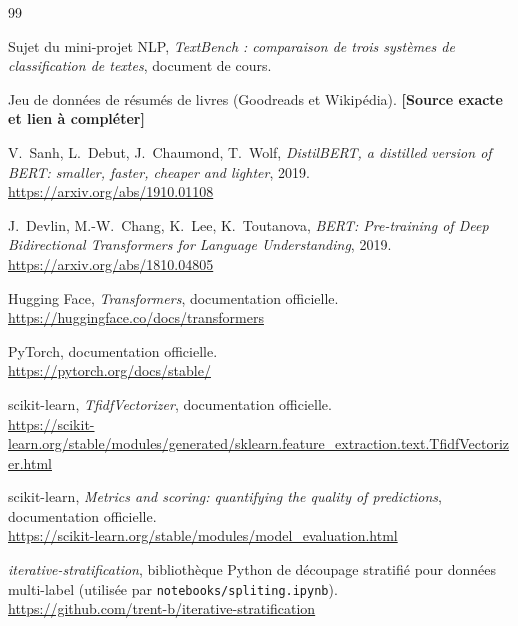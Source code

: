 \documentclass[11pt,a4paper]{article}
\newcommand{\afournir}[1]{\textbf{[#1 à compléter]}}
\begin{document}
\newpage
{}
\begin{thebibliography}{99}

Sujet du mini-projet NLP, \textit{TextBench : comparaison de trois systèmes de classification de textes}, document de cours.

Jeu de données de résumés de livres (Goodreads et Wikipédia). \afournir{Source exacte et lien}

V.~Sanh, L.~Debut, J.~Chaumond, T.~Wolf, \textit{DistilBERT, a distilled version of BERT: smaller, faster, cheaper and lighter}, 2019. \\
\url{https://arxiv.org/abs/1910.01108}

J.~Devlin, M.-W.~Chang, K.~Lee, K.~Toutanova, \textit{BERT: Pre-training of Deep Bidirectional Transformers for Language Understanding}, 2019. \\
\url{https://arxiv.org/abs/1810.04805}

Hugging Face, \textit{Transformers}, documentation officielle. \\
\url{https://huggingface.co/docs/transformers}

PyTorch, documentation officielle. \\
\url{https://pytorch.org/docs/stable/}

scikit-learn, \textit{TfidfVectorizer}, documentation officielle. \\
\url{https://scikit-learn.org/stable/modules/generated/sklearn.feature_extraction.text.TfidfVectorizer.html}

scikit-learn, \textit{Metrics and scoring: quantifying the quality of predictions}, documentation officielle. \\
\url{https://scikit-learn.org/stable/modules/model_evaluation.html}

\textit{iterative-stratification}, bibliothèque Python de découpage stratifié pour données multi-label (utilisée par \texttt{notebooks/spliting.ipynb}). \\
\url{https://github.com/trent-b/iterative-stratification}

\end{thebibliography}
\end{document}
